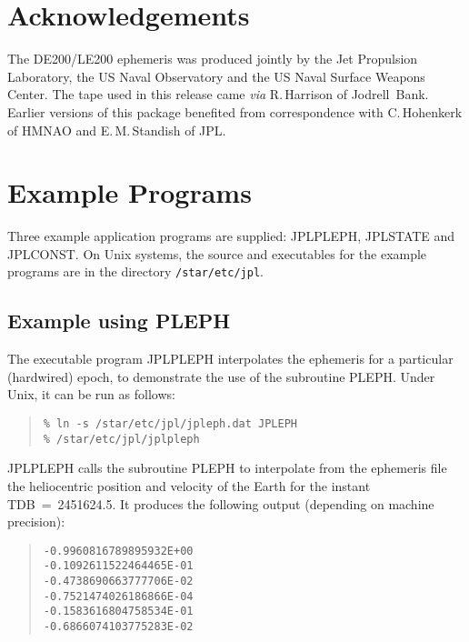 \documentclass[twoside,11pt]{article}
\newcommand{\xlabel}[1]{}
\renewcommand{\_}{\texttt{\symbol{95}}}
\begin{document}
\section{\xlabel{acknowledgements}Acknowledgements}
\label{acknowledgements}

The DE200/LE200 ephemeris was produced jointly by the Jet Propulsion
Laboratory, the US Naval Observatory and the US Naval Surface Weapons
Center.  The tape used in this release came \textit{via}\/ R.\,Harrison
of Jodrell~Bank.  Earlier versions of this package benefited from
correspondence with C.\,Hohenkerk of HMNAO and E.\,M.\,Standish of JPL.

\newpage
\appendix

\section{\xlabel{example_programs}Example Programs}
\label{example_programs}

Three example application programs are supplied: JPLPLEPH, JPLSTATE and
JPLCONST.  On Unix systems, the source and executables for the example
programs are in the directory \texttt{/star/etc/jpl}.  

\subsection{\xlabel{example_using_pleph}Example using PLEPH} 
\label{example_using_pleph}

The executable program JPLPLEPH interpolates the ephemeris for a
particular (hardwired) epoch, to demonstrate the use of the subroutine
PLEPH. Under Unix, it can be run as follows:

\begin{quote}
\begin{verbatim}
% ln -s /star/etc/jpl/jpleph.dat JPLEPH
% /star/etc/jpl/jplpleph
\end{verbatim}
\end{quote}

JPLPLEPH calls the subroutine PLEPH to interpolate from the ephemeris
file the heliocentric position and velocity of the Earth for the instant
TDB~=~2451624.5.  It produces the following output (depending on machine
precision):

\begin{quote}
\begin{verbatim}
-0.9960816789895932E+00
-0.1092611522464465E-01
-0.4738690663777706E-02
-0.7521474026186866E-04
-0.1583616804758534E-01
-0.6866074103775283E-02
\end{verbatim}
\end{quote}
\end{document}
